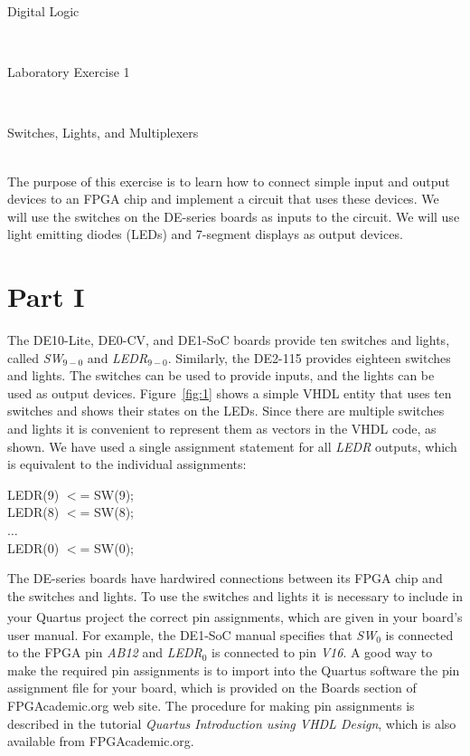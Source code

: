 \documentclass[epsfig,10pt,fullpage]{article}
\newcommand{\LabNum}{1}
\begin{document}
\centerline{\huge Digital Logic}
~\\
\centerline{\huge Laboratory Exercise \LabNum}
~\\
\centerline{\large Switches, Lights, and Multiplexers}
~\\

The purpose of this exercise is to learn how to connect simple input and
output devices to an FPGA chip and implement a circuit that uses these devices.
We will use the switches on the DE-series boards as inputs to the circuit.
We will use light emitting diodes (LEDs) and 7-segment displays as output
devices.

\section*{Part I}
The DE10-Lite, DE0-CV, and DE1-SoC boards provide ten switches and lights, called 
{\it SW}$_{9-0}$ and {\it LEDR}$_{9-0}$. Similarly, the DE2-115 provides eighteen switches 
and lights. The switches can be used to provide inputs, and the lights can be used as 
output devices. Figure~\ref{fig:1} shows a simple VHDL entity that uses ten switches 
and shows their states on the LEDs. Since there are multiple switches and lights
it is convenient to represent them as vectors in the VHDL code, as shown. We have used a
single assignment statement for all {\it LEDR} outputs, which is equivalent to the 
individual assignments:

\begin{center}
\begin{minipage}[t]{12.5 cm}
\begin{tabbing}
LEDR(9) $<$= SW(9);\\
LEDR(8) $<$= SW(8);\\
$\ldots$\\
LEDR(0) $<$= SW(0);
\end{tabbing}
\end{minipage}
\end{center}

The DE-series boards have hardwired connections between its FPGA chip and the switches and
lights. To use the switches and lights it is necessary to include in
your Quartus\textsuperscript{\textregistered} project the correct pin assignments, which are 
given in your board's user manual. For example, the DE1-SoC manual specifies that 
{\it SW}$_0$ is connected to the FPGA pin {\it AB12} and {\it LEDR}$_0$ is connected to 
pin {\it V16}. A good way to make the required pin assignments is to import into the 
Quartus software the pin assignment file for your board, which is provided on the 
Boards section of FPGAcademic.org web site. The procedure for making pin assignments is 
described in the tutorial {\it Quartus Introduction using VHDL Design}, which is 
also available from FPGAcademic.org.
~\\
\end{document}
